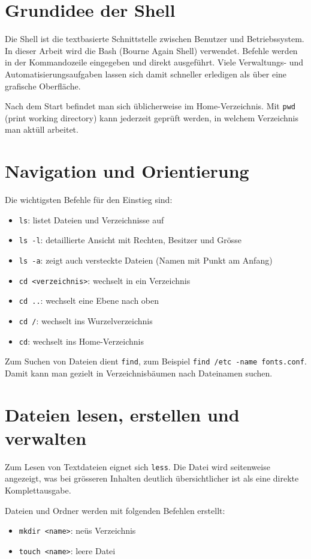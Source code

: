 \documentclass[11pt, oneside, numbers=nönddot]{scrbook}
\begin{document}
\section{Grundidee der Shell}
Die Shell ist die textbasierte Schnittstelle zwischen Benutzer und Betriebssystem. In dieser Arbeit wird die Bash (Bourne Again Shell) verwendet. Befehle werden in der Kommandozeile eingegeben und direkt ausgeführt. Viele Verwaltungs- und Automatisierungsaufgaben lassen sich damit schneller erledigen als über eine grafische Oberfläche.

Nach dem Start befindet man sich üblicherweise im Home-Verzeichnis. Mit \texttt{pwd} (print working directory) kann jederzeit geprüft werden, in welchem Verzeichnis man aktüll arbeitet.

\section{Navigation und Orientierung}
Die wichtigsten Befehle für den Einstieg sind:
\begin{itemize}
\item \texttt{ls}: listet Dateien und Verzeichnisse auf
\item \texttt{ls -l}: detaillierte Ansicht mit Rechten, Besitzer und Grösse
\item \texttt{ls -a}: zeigt auch versteckte Dateien (Namen mit Punkt am Anfang)
\item \texttt{cd <verzeichnis>}: wechselt in ein Verzeichnis
\item \texttt{cd ..}: wechselt eine Ebene nach oben
\item \texttt{cd /}: wechselt ins Wurzelverzeichnis
\item \texttt{cd}: wechselt ins Home-Verzeichnis
\end{itemize}

Zum Suchen von Dateien dient \texttt{find}, zum Beispiel \texttt{find /etc -name fonts.conf}. Damit kann man gezielt in Verzeichnisbäumen nach Dateinamen suchen.

\section{Dateien lesen, erstellen und verwalten}
Zum Lesen von Textdateien eignet sich \texttt{less}. Die Datei wird seitenweise angezeigt, was bei grösseren Inhalten deutlich übersichtlicher ist als eine direkte Komplettausgabe.

Dateien und Ordner werden mit folgenden Befehlen erstellt:
\begin{itemize}
\item \texttt{mkdir <name>}: neüs Verzeichnis
\item \texttt{touch <name>}: leere Datei
\end{itemize}
\end{document}
